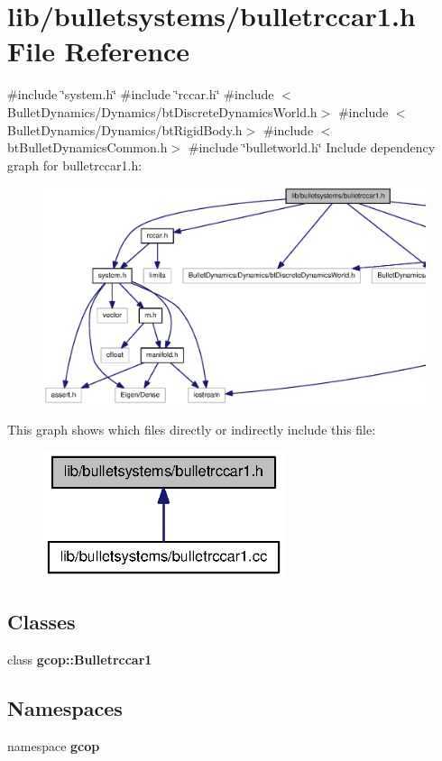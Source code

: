 \section{lib/bulletsystems/bulletrccar1.h \-File \-Reference}
\label{bulletrccar1_8h}
{\ttfamily \#include \char`\"{}system.\-h\char`\"{}}\*
{\ttfamily \#include \char`\"{}rccar.\-h\char`\"{}}\*
{\ttfamily \#include $<$\-Bullet\-Dynamics/\-Dynamics/bt\-Discrete\-Dynamics\-World.\-h$>$}\*
{\ttfamily \#include $<$\-Bullet\-Dynamics/\-Dynamics/bt\-Rigid\-Body.\-h$>$}\*
{\ttfamily \#include $<$bt\-Bullet\-Dynamics\-Common.\-h$>$}\*
{\ttfamily \#include \char`\"{}bulletworld.\-h\char`\"{}}\*
\-Include dependency graph for bulletrccar1.\-h\-:\nopagebreak
\begin{figure}[H]
\begin{center}
\leavevmode
\includegraphics[width=350pt]{bulletrccar1_8h__incl}
\end{center}
\end{figure}
\-This graph shows which files directly or indirectly include this file\-:\nopagebreak
\begin{figure}[H]
\begin{center}
\leavevmode
\includegraphics[width=200pt]{bulletrccar1_8h__dep__incl}
\end{center}
\end{figure}
\subsection*{\-Classes}
\begin{DoxyCompactItemize}
\item 
class {\bf gcop\-::\-Bulletrccar1}
\end{DoxyCompactItemize}
\subsection*{\-Namespaces}
\begin{DoxyCompactItemize}
\item 
namespace {\bf gcop}
\end{DoxyCompactItemize}
